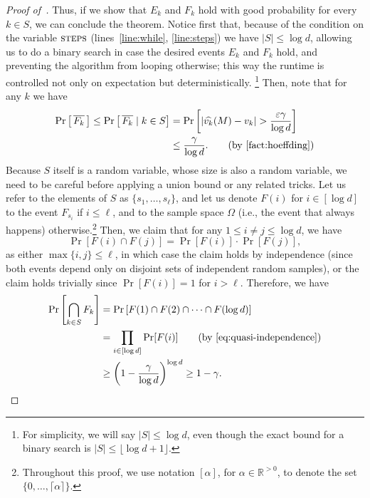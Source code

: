 \begin{proof}[Proof of~]
Thus, if we show that $E_k$ and $F_k$ hold with good probability for every $k \in S$, we can conclude the theorem.
Notice first that, because of the condition on the variable $\textsc{steps}$ (lines~\ref{line:while}, \ref{line:steps}) we have $|S| \leq \log d$, allowing us to do a binary search in case the desired events $E_k$ and $F_k$ hold, and preventing the algorithm from looping otherwise; this way the runtime is controlled not only on expectation but deterministically. \footnote{For simplicity, we will say $|S| \leq \log d$, even though the exact bound for a binary search is $|S| \leq \lfloor \log d  + 1 \rfloor$.} Then, note that for any $k$ we have
\begin{align*}
	\Pr\left[ \, \overline{F_k} \,\right] \leq \Pr\left[ \, \overline{F_k} \mid k \in S \right] &= \Pr\left[|\widehat{v_k}(M) - v_k| > \frac{\varepsilon \gamma}{\log d}\right]\\
	&\leq \frac{\gamma}{\log d}. \tag{by~\Cref{fact:hoeffding}}
\end{align*}
Because $S$ itself is a random variable, whose size is also a random variable, we need to be careful before applying a union bound or any related tricks. Let us refer to the elements of $S$ as $\{s_1, \ldots, s_\ell\}$, and let us denote $F(i)$ for $i \in [\log d]$ to the event $F_{s_i}$ if $i \leq \ell$, and to the sample space $\Omega$ (i.e., the event that always happens) otherwise.\footnote{Throughout this proof, we use notation $[\alpha]$, for $\alpha \in \mathbb{R}^{> 0}$, to denote the set $\{0, \ldots, \lceil \alpha \rceil\}$.}  Then, we claim that for any $1 \leq i \neq j \leq \log d$, we have 
\begin{equation}\label{eq:quasi-independence}
	\Pr[F(i) \cap F(j)] = \Pr[F(i)] \cdot \Pr[F(j)],
\end{equation}
as either $\max \{i, j\} \leq \ell$, in which case the claim holds by independence (since both events depend only on disjoint sets of independent random samples), or the claim holds trivially since $\Pr[F(i)] = 1$ for $i > \ell$.
Therefore, we have 
\begin{align*}
\Pr\left[\bigcap_{k \in S} F_k\right] &= \Pr\left[F(1) \cap F(2) \cap \cdots \cap F(\log d)\right]\\
&= \prod_{i \in [\log d]} \Pr[F(i)]\tag{by~\Cref{eq:quasi-independence}}\\
&\geq \left(1 - \frac{\gamma}{\log d}\right)^{\log d} \geq 1 - \gamma.
\end{align*}

\end{proof}
